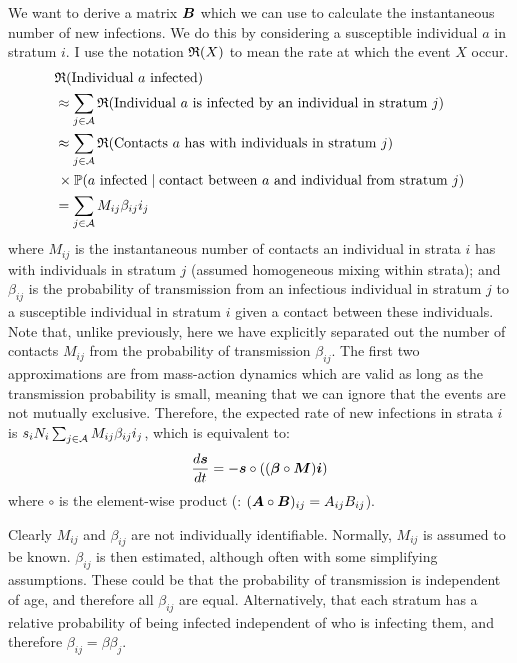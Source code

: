 \documentclass[thesis.tex]{subfiles}
\begin{document}
We want to derive a matrix $\bm{B}$ which we can use to calculate the instantaneous number of new infections.
We do this by considering a susceptible individual $a$ in stratum $i$.
I use the notation $\mathfrak{R}(X)$ to mean the rate at which the event $X$ occur.
\begin{align}
    &\mathfrak{R}(\text{Individual $a$ infected}) \\
    &\approx \sum_{j \in \mathcal{A}} \mathfrak{R}(\text{Individual $a$ is infected by an individual in stratum $j$}) \\
    &\approx \sum_{j \in \mathcal{A}} \mathfrak{R}(\text{Contacts $a$ has with individuals in stratum $j$}) \\ &\, \times \operatorname{\mathbb{P}}(\text{$a$ infected} \mid \text{contact between $a$ and individual from stratum $j$})\\
    &= \sum_{j \in \mathcal{A}} M_{ij} \beta_{ij} i_j
\end{align}
where $M_{ij}$ is the instantaneous number of contacts an individual in strata $i$ has with individuals in stratum $j$ (assumed homogeneous mixing within strata); and $\beta_{ij}$ is the probability of transmission from an infectious individual in stratum $j$ to a susceptible individual in stratum $i$ given a contact between these individuals.
Note that, unlike previously, here we have explicitly separated out the number of contacts $M_{ij}$ from the probability of transmission $\beta_{ij}$.
The first two approximations are from mass-action dynamics which are valid as long as the transmission probability is small, meaning that we can ignore that the events are not mutually exclusive.
Therefore, the expected rate of new infections in strata $i$ is $s_i N_i \sum_{j \in \mathcal{A}} M_{ij} \beta_{ij} i_j$, which is equivalent to:
\begin{align}
    \frac{d\bm{s}}{dt} = -\bm{s} \circ ((\bm{\beta} \circ \bm{M}) \bm{i})
    \label{eq:matrix:theory}
\end{align}
where $\circ$ is the element-wise product (\ie: $(\bm{A} \circ \bm{B})_{ij} = A_{ij} B_{ij}$).

Clearly $M_{ij}$ and $\beta_{ij}$ are not individually identifiable.
Normally, $M_{ij}$ is assumed to be known.
$\beta_{ij}$ is then estimated, although often with some simplifying assumptions.
These could be that the probability of transmission is independent of age, and therefore all $\beta_{ij}$ are equal.
Alternatively, that each stratum has a relative probability of being infected independent of who is infecting them, and therefore $\beta_{ij} = \beta \beta_j$.
\end{document}
